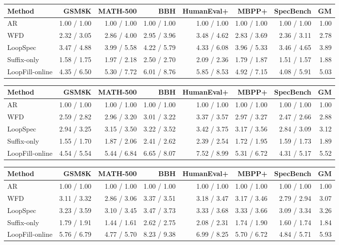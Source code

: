 \begin{tabular}{lrrrrrrr}
\hline
Method & GSM8K & MATH-500 & BBH & HumanEval+ & MBPP+ & SpecBench & GM \\
\hline
AR & 1.00 / 1.00 & 1.00 / 1.00 & 1.00 / 1.00 & 1.00 / 1.00 & 1.00 / 1.00 & 1.00 / 1.00 & 1.00 \\
WFD & 2.32 / 3.05 & 2.86 / 4.00 & 2.95 / 3.96 & 3.48 / 4.62 & 2.83 / 3.69 & 2.36 / 3.11 & 2.78 \\
LoopSpec & 3.47 / 4.88 & 3.99 / 5.58 & 4.22 / 5.79 & 4.33 / 6.08 & 3.96 / 5.33 & 3.46 / 4.65 & 3.89 \\
Suffix-only & 1.58 / 1.75 & 1.97 / 2.18 & 2.50 / 2.70 & 2.09 / 2.36 & 1.79 / 1.87 & 1.51 / 1.57 & 1.88 \\
LoopFill-online & 4.35 / 6.50 & 5.30 / 7.72 & 6.01 / 8.76 & 5.85 / 8.53 & 4.92 / 7.15 & 4.08 / 5.91 & 5.03 \\
\hline
\end{tabular}

\begin{tabular}{lrrrrrrr}
\hline
Method & GSM8K & MATH-500 & BBH & HumanEval+ & MBPP+ & SpecBench & GM \\
\hline
AR & 1.00 / 1.00 & 1.00 / 1.00 & 1.00 / 1.00 & 1.00 / 1.00 & 1.00 / 1.00 & 1.00 / 1.00 & 1.00 \\
WFD & 2.59 / 2.82 & 2.96 / 3.20 & 3.01 / 3.22 & 3.37 / 3.57 & 2.97 / 3.27 & 2.47 / 2.66 & 2.88 \\
LoopSpec & 2.94 / 3.25 & 3.15 / 3.50 & 3.22 / 3.52 & 3.42 / 3.75 & 3.17 / 3.56 & 2.84 / 3.09 & 3.12 \\
Suffix-only & 1.55 / 1.70 & 1.87 / 2.06 & 2.41 / 2.62 & 2.39 / 2.54 & 1.72 / 1.95 & 1.59 / 1.73 & 1.89 \\
LoopFill-online & 4.54 / 5.54 & 5.44 / 6.84 & 6.65 / 8.07 & 7.52 / 8.99 & 5.31 / 6.72 & 4.31 / 5.17 & 5.52 \\
\hline
\end{tabular}

\begin{tabular}{lrrrrrrr}
\hline
Method & GSM8K & MATH-500 & BBH & HumanEval+ & MBPP+ & SpecBench & GM \\
\hline
AR & 1.00 / 1.00 & 1.00 / 1.00 & 1.00 / 1.00 & 1.00 / 1.00 & 1.00 / 1.00 & 1.00 / 1.00 & 1.00 \\
WFD & 3.11 / 3.32 & 2.86 / 3.06 & 3.37 / 3.51 & 3.18 / 3.47 & 3.17 / 3.46 & 2.79 / 2.94 & 3.07 \\
LoopSpec & 3.23 / 3.59 & 3.10 / 3.45 & 3.47 / 3.73 & 3.33 / 3.68 & 3.33 / 3.66 & 3.09 / 3.34 & 3.26 \\
Suffix-only & 1.79 / 1.91 & 1.44 / 1.61 & 2.62 / 2.75 & 2.08 / 2.31 & 1.74 / 1.90 & 1.60 / 1.74 & 1.84 \\
LoopFill-online & 5.76 / 6.79 & 4.77 / 5.70 & 8.23 / 9.38 & 6.99 / 8.25 & 5.70 / 6.72 & 4.84 / 5.71 & 5.93 \\
\hline
\end{tabular}
